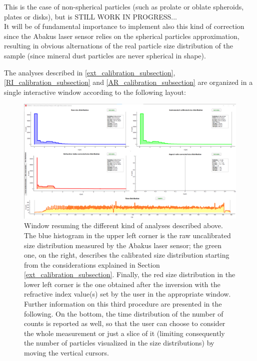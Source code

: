 \documentclass[a4paper, 11pt]{report}
\begin{document}
This is the case of non-spherical particles (such as prolate or oblate spheroids, plates or disks), but is STILL WORK IN PROGRESS... \\
It will be of fundamental importance to implement also this kind of correction since the Abakus laser sensor relies on the spherical particles approximation, resulting in obvious alternations of the real particle size distribution of the sample (since mineral dust particles are never spherical in shape).

\newpage

The analyses described in \ref{ext_calibration_subsection}, \ref{RI_calibration_subsection} and \ref{AR_calibration_subsection} are organized in a single interactive window according to the following layout:
\begin{figure}[!htb]
	\centering	
	\includegraphics[scale=0.32]{plot_correction_1.png}
	\caption{Window resuming the different kind of analyses described above. The blue histogram in the upper left corner is the raw uncalibrated size distribution measured by the Abakus laser sensor; the green one, on the right, describes the calibrated size distribution starting from the considerations explained in Section \ref{ext_calibration_subsection}. Finally, the red size distribution in the lower left corner is the one obtained after the inversion with the refractive index value(s) set by the user in the appropriate window. Further information on this third procedure are presented in the following. On the bottom, the time distribution of the number of counts is reported as well, so that the user can choose to consider the whole measurement or just a slice of it (limiting consequently the number of particles visualized in the size distributions) by moving the vertical cursors.}
	\label{plot_correction}
\end{figure}
\newline
\end{document}
